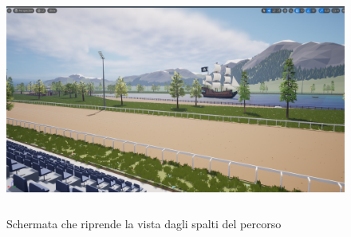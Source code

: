     \begin{figure}[!ht]
        \centering
        \includegraphics[height=7.5cm]{figure/NaveDaSpaltiCropped.png}
        \caption{Schermata che riprende la vista dagli spalti del percorso}
    \end{figure}
    




